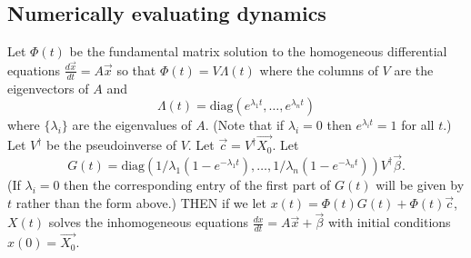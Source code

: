 \documentclass{article}
\begin{document}
\subsection{Numerically evaluating dynamics }
\begin{claim}
Let $\Phi(t)$ be the fundamental matrix solution to the homogeneous differential equations $\frac{d\vec{x}}{dt}=A\vec{x}$ so that $\Phi(t)=V\Lambda(t)$ where the columns of $V$ are the eigenvectors of $A$ and $$\Lambda(t)=\text{diag}(e^{\lambda_1 t},\dots,e^{\lambda_n t})$$ where $\{\lambda_i\}$ are the eigenvalues of $A$.  (Note that if $\lambda_i=0$ then $e^{\lambda _i t}=1$ for all $t$.) Let $V^\dagger$ be the pseudoinverse of $V$.  Let $\vec{c}=V^\dagger\vec{X_0}$.  Let $$G(t)=\text{diag}(1/\lambda_1(1-e^{-\lambda_1t}),\dots,1/\lambda_n(1-e^{-\lambda_nt}))V^\dagger\vec{\beta}.$$
(If $\lambda_i=0$ then the corresponding entry of the first part of $G(t)$ will be given by $t$ rather than the form above.)  THEN if we let $x(t)=\Phi(t)G(t)+\Phi(t)\vec{c}$, $X(t)$ solves the inhomogeneous equations $\frac{dx}{dt}=A\vec{x}+\vec{\beta}$ with initial conditions $x(0)=\vec{X_0}$.
\end{claim}
\end{document}
